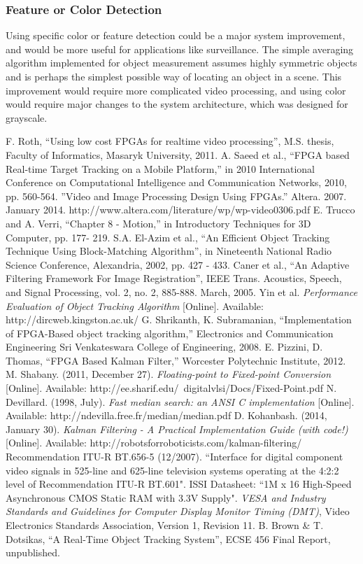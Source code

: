 \documentclass[11pt]{article} %
\begin{document}
\subsubsection{Feature or Color Detection}
Using specific color or feature detection could be a major system improvement, and would be more useful for applications like surveillance. The simple averaging algorithm implemented for object measurement assumes highly symmetric objects and is perhaps the simplest possible way of locating an object in a scene. This improvement would require more complicated video processing, and using color would require major changes to the system architecture, which was designed for grayscale.
\newpage
\begin{thebibliography}{11}
F. Roth, “Using low cost FPGAs for realtime video processing”, M.S. thesis, Faculty of Informatics, Masaryk University, 2011.
A. Saeed et al., “FPGA based Real-time Target Tracking on a Mobile Platform,” in 2010 International Conference on Computational Intelligence and Communication Networks, 2010, pp. 560-564.
”Video and Image Processing Design Using FPGAs.” Altera. 2007. January 2014. 
http://www.altera.com/literature/wp/wp-video0306.pdf  
E. Trucco and A. Verri, “Chapter 8 - Motion,” in Introductory Techniques for 3D Computer, pp. 177- 219.
S.A. El-Azim et al., “An Efficient Object Tracking Technique Using Block-Matching Algorithm”, in Nineteenth National Radio Science Conference, Alexandria, 2002, pp. 427 - 433.
Caner et al., “An Adaptive Filtering Framework For Image Registration”, IEEE Trans. Acoustics, Speech, and Signal Processing, vol. 2, no. 2, 885-888. March, 2005. 
Yin et al. \textit{Performance Evaluation of Object Tracking Algorithm} [Online]. Available: http://dircweb.kingston.ac.uk/ 
G. Shrikanth, K. Subramanian, “Implementation of FPGA-Based object tracking algorithm,” Electronics and Communication Engineering Sri Venkateswara College of Engineering, 2008.
E. Pizzini, D. Thomas, “FPGA Based Kalman Filter,” Worcester Polytechnic Institute, 2012.
M. Shabany. (2011, December 27). \textit{Floating-point to Fixed-point Conversion} [Online]. Available: http://ee.sharif.edu/~digitalvlsi/Docs/Fixed-Point.pdf
N. Devillard. (1998, July). \textit{Fast median search: an ANSI C implementation} [Online]. Available: http://ndevilla.free.fr/median/median.pdf
D. Kohanbash. (2014, January 30). \textit{Kalman Filtering - A Practical Implementation Guide (with code!)} [Online]. Available: http://robotsforroboticists.com/kalman-filtering/
 Recommendation ITU-R BT.656-5 (12/2007). “Interface for digital component video signals in 525-line and 625-line television systems operating at the 4:2:2 level of Recommendation ITU-R BT.601". 
 ISSI Datasheet: “1M x 16 High-Speed Asynchronous CMOS Static RAM with 3.3V Supply".
 \textit{VESA and Industry Standards and Guidelines for Computer Display Monitor Timing (DMT)}, Video Electronics Standards Association, Version 1, Revision 11.
 B. Brown \& T. Dotsikas, “A Real-Time Object Tracking System”, ECSE 456 Final Report, unpublished.
\end{thebibliography}
\end{document}
